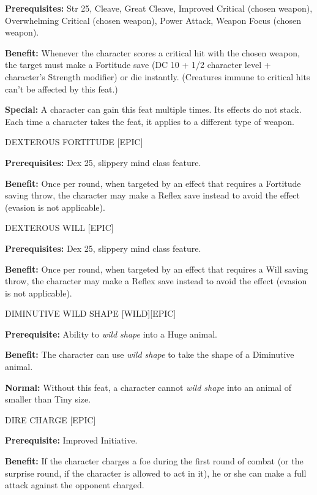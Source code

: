 \documentclass{article}
\begin{document}
\textbf{Prerequisites:} Str 25, Cleave, Great Cleave, Improved Critical (chosen 
weapon), Overwhelming Critical (chosen weapon), Power Attack, Weapon Focus (chosen 
weapon). 

\textbf{Benefit:} Whenever the character scores a critical hit with the chosen 
weapon, the target must make a Fortitude save (DC 10 + 1/2 character level + character's 
Strength modifier) or die instantly. (Creatures immune to critical hits can't be 
affected by this feat.) 

\textbf{Special:} A character can gain this feat multiple times. Its effects do 
not stack. Each time a character takes the feat, it applies to a different type 
of weapon. 

\vspace{12pt}
DEXTEROUS FORTITUDE [EPIC] 

\textbf{Prerequisites:} Dex 25, slippery mind class feature. 

\textbf{Benefit:} Once per round, when targeted by an effect that requires a Fortitude 
saving throw, the character may make a Reflex save instead to avoid the effect 
(evasion is not applicable). 

\vspace{12pt}
DEXTEROUS WILL [EPIC] 

\textbf{Prerequisites:} Dex 25, slippery mind class feature. 

\textbf{Benefit:} Once per round, when targeted by an effect that requires a Will 
saving throw, the character may make a Reflex save instead to avoid the effect 
(evasion is not applicable). 

\vspace{12pt}
DIMINUTIVE WILD SHAPE [WILD][EPIC] 

\textbf{Prerequisite:} Ability to \textit{wild shape }into a Huge animal. 

\textbf{Benefit:} The character can use \textit{wild shape }to take the shape of 
a Diminutive animal. 

\textbf{Normal:} Without this feat, a character cannot \textit{wild shape }into 
an animal of smaller than Tiny size. 

\vspace{12pt}
DIRE CHARGE [EPIC] 

\textbf{Prerequisite:} Improved Initiative. 

\textbf{Benefit:} If the character charges a foe during the first round of combat 
(or the surprise round, if the character is allowed to act in it), he or she can 
make a full attack against the opponent charged. 
\end{document}

